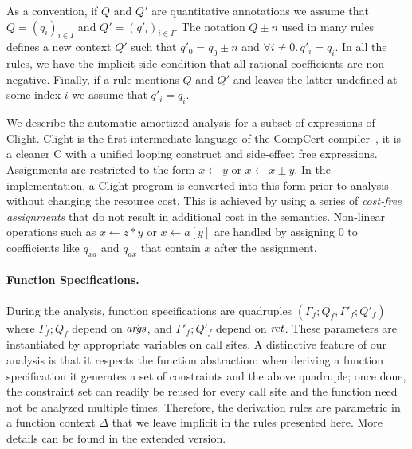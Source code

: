 \documentclass{sigplanconf}
\newcommand{\ifshort}[2]{\ifx\fullversion\undefined{#1}\else{#2}\fi}
\newcommand{\paraskip}[0]{\ifshort{\vspace{-4pt}}{}}
\begin{document}

As a convention, if $Q$ and $Q'$ are quantitative annotations
we assume that $Q = (q_i)_{i\in I}$ and $Q' = (q'_i)_{i \in I}$.
The notation $Q \pm n$ used in many rules defines a new context $Q'$
such that $q'_0 = q_0 \pm n$ and $\forall i \neq 0 .\, q'_i = q_i$.
In all the rules, we have the implicit side condition that all rational
coefficients are non-negative.  Finally, if a rule mentions $Q$ and $Q'$
and leaves the latter undefined at some index $i$ we assume that $q'_i = q_i$.

We describe the automatic amortized analysis for a subset of
expressions of Clight.  Clight is the first intermediate
language of the CompCert compiler~\cite{CompcertCACM}, it
is a cleaner C with a unified looping construct and
side-effect free expressions.
Assignments are restricted to the form $x \gets
y$ or $x \gets x \pm y$.  In the implementation, a Clight
program is converted into this form prior to analysis without changing
the resource cost.  This is achieved by using a series of \emph{cost-free
  assignments} that do not result in additional cost in the
semantics.  Non-linear operations such as $x \gets z*y$ or $x \gets
a[y]$ are handled by assigning $0$ to coefficients
like $q_{xa}$ and $q_{ax}$ that contain $x$ after the assignment.

\paraskip
\paragraph{Function Specifications.}

During the analysis, function specifications are quadruples
$(\Gamma_f; Q_f, \Gamma'_f; Q'_f)$ where $\Gamma_f; Q_f$ depend on
${\vec {\mathit{args}}}$, and $\Gamma'_f; Q'_f$ depend on ${\mathit{ret}}$.  These parameters
are instantiated by appropriate variables on call sites.  A distinctive
feature of our analysis is that it respects the function abstraction:
when deriving a function specification it generates a set of
constraints and the above quadruple; once done, the constraint
set can readily be reused for every call site and the function need
not be analyzed multiple times.
%
Therefore, the derivation rules are parametric in a function context $\Delta$
that we leave implicit in the rules presented here. More details
can be found in the extended version.
\end{document}
